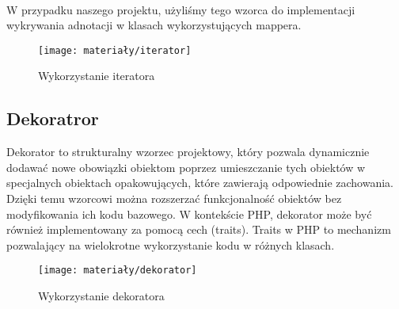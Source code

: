 \paragraph{} W przypadku naszego projektu, użyliśmy tego wzorca do implementacji wykrywania adnotacji w klasach wykorzystujących mappera.

\begin{figure}[ht]
	\centering
	\texttt{[image: materiały/iterator]}
	\caption{Wykorzystanie iteratora}
\end{figure}


\subsection{Dekoratror}
Dekorator to strukturalny wzorzec projektowy, który pozwala dynamicznie dodawać nowe obowiązki obiektom poprzez umieszczanie tych obiektów w specjalnych obiektach opakowujących, które zawierają odpowiednie zachowania. Dzięki temu wzorcowi można rozszerzać funkcjonalność obiektów bez modyfikowania ich kodu bazowego. W kontekście PHP, dekorator może być również implementowany za pomocą cech (traits). Traits w PHP to mechanizm pozwalający na wielokrotne wykorzystanie kodu w różnych klasach.

\begin{figure}[ht]
	\centering
	\texttt{[image: materiały/dekorator]}
	\caption{Wykorzystanie dekoratora}
\end{figure} 